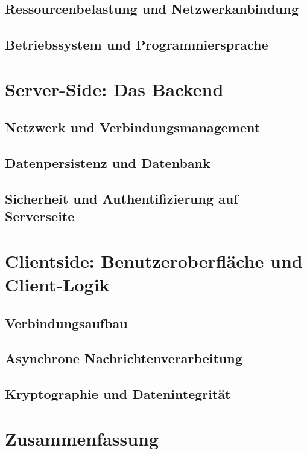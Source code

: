 \subsection{Ressourcenbelastung und Netzwerkanbindung}

\subsection{Betriebssystem und Programmiersprache}

\section{Server-Side: Das Backend}

\subsection{Netzwerk und Verbindungsmanagement}

\subsection{Datenpersistenz und Datenbank}

\subsection{Sicherheit und Authentifizierung auf Serverseite}

\section{Clientside: Benutzeroberfläche und Client-Logik}

\subsection{Verbindungsaufbau}

\subsection{Asynchrone Nachrichtenverarbeitung}

\subsection{Kryptographie und Datenintegrität}

\section{Zusammenfassung}